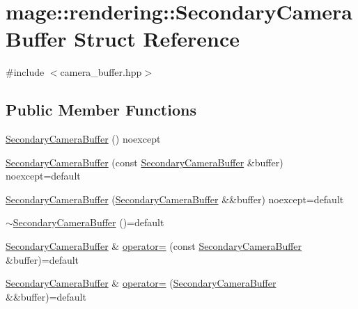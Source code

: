 \hypertarget{structmage_1_1rendering_1_1_secondary_camera_buffer}{}\section{mage\+:\+:rendering\+:\+:Secondary\+Camera\+Buffer Struct Reference}
\label{structmage_1_1rendering_1_1_secondary_camera_buffer}


{\ttfamily \#include $<$camera\+\_\+buffer.\+hpp$>$}

\subsection*{Public Member Functions}
\begin{DoxyCompactItemize}
\item 
\mbox{\hyperlink{structmage_1_1rendering_1_1_secondary_camera_buffer_a296dad06794aeb4017c37d3aa8eb9641}{Secondary\+Camera\+Buffer}} () noexcept
\item 
\mbox{\hyperlink{structmage_1_1rendering_1_1_secondary_camera_buffer_a8f1945d8c623d5ac685ff8fbaeffd09c}{Secondary\+Camera\+Buffer}} (const \mbox{\hyperlink{structmage_1_1rendering_1_1_secondary_camera_buffer}{Secondary\+Camera\+Buffer}} \&buffer) noexcept=default
\item 
\mbox{\hyperlink{structmage_1_1rendering_1_1_secondary_camera_buffer_a72efd73a7db74ad11f12c720b557cf0e}{Secondary\+Camera\+Buffer}} (\mbox{\hyperlink{structmage_1_1rendering_1_1_secondary_camera_buffer}{Secondary\+Camera\+Buffer}} \&\&buffer) noexcept=default
\item 
\mbox{\hyperlink{structmage_1_1rendering_1_1_secondary_camera_buffer_a0ee38cfcaf0cb5961ffc1c37fcb71b3f}{$\sim$\+Secondary\+Camera\+Buffer}} ()=default
\item 
\mbox{\hyperlink{structmage_1_1rendering_1_1_secondary_camera_buffer}{Secondary\+Camera\+Buffer}} \& \mbox{\hyperlink{structmage_1_1rendering_1_1_secondary_camera_buffer_ad26ba75c577c29c131aeab66a22444bd}{operator=}} (const \mbox{\hyperlink{structmage_1_1rendering_1_1_secondary_camera_buffer}{Secondary\+Camera\+Buffer}} \&buffer)=default
\item 
\mbox{\hyperlink{structmage_1_1rendering_1_1_secondary_camera_buffer}{Secondary\+Camera\+Buffer}} \& \mbox{\hyperlink{structmage_1_1rendering_1_1_secondary_camera_buffer_ae559ef0e3a2c5e01963fa744a427cdc7}{operator=}} (\mbox{\hyperlink{structmage_1_1rendering_1_1_secondary_camera_buffer}{Secondary\+Camera\+Buffer}} \&\&buffer)=default
\end{DoxyCompactItemize}
